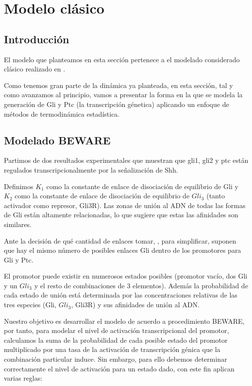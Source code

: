 
\chapter{Modelo clásico}

\label{ch:modelo_clasico}

\section{Introducción}
El modelo que planteamos en esta sección pertenece a el modelado considerado clásico realizado en \cite{schaffer}.

Como tenemos gran parte de la dinámica ya planteada, en esta sección, tal y como avanzamos al principio, vamos a presentar la forma en la que se modela la generación de Gli y Ptc (la transcripción génetica) aplicando un enfoque de métodos de termodinámica estadística.

\section{Modelado BEWARE}
 
 
 
 Partimos de dos resultados experimentales que muestran que gli1, gli2 y ptc están regulados transcripcionalmente por la señalización de Shh.
 
  Definimos $K_1$ como la constante de enlace de disociación de equilibrio de Gli y $K_2$ como la constante de enlace de disociación de equilibrio de $Gli_3$ (tanto activador como represor, Gli3R). Las zonas de unión al ADN de todas las formas de Gli están altamente relacionadas, lo que sugiere que estas las afinidades son similares.
  
  Ante la decisión de qué cantidad de enlaces tomar, \cite{schaffer}, para simplificar, suponen que hay el mismo número de posibles enlaces Gli dentro de los
  promotores para Gli y Ptc.
  
  
  El promotor puede existir en numerosos
  estados posibles (promotor vacío, dos Gli  y un $Gli_3$ y el resto de combinaciones de 3 elementos). Además la probabilidad de cada estado de unión está determinada por las concentraciones relativas de las tres especies (Gli, $Gli_3$, Gli3R) y sus afinidades de unión al ADN. 
  
  
  Nuestro objetivo es desarrollar el modelo de acuerdo a procedimiento BEWARE, por tanto, para modelar el nivel de activación transcripcional del promotor, calculamos la suma de la probabilidad de cada posible estado del promotor multiplicado por una tasa de la activación de transcripción génica que la combinación particular
  induce.
  Sin embargo, para ello debemos determinar correctamente  el nivel de activación para un estado dado, con este fin \cite{schaffer,saha} aplican varias reglas:
   
